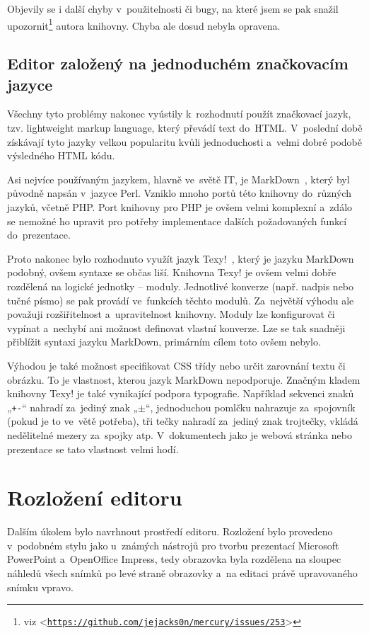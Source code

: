 \documentclass[11pt,twoside,a4paper]{book}
\let\oldUrl\url									%
\renewcommand\url[1]{<\texttt{\oldUrl{#1}}>}
\begin{document}
Objevily se i další chyby v~použitelnosti či bugy, na které jsem se pak snažil upozornit\footnote{viz \url{https://github.com/jejacks0n/mercury/issues/253}} autora knihovny. Chyba ale dosud nebyla opravena.

\subsection{Editor založený na jednoduchém značkovacím jazyce}
Všechny tyto problémy nakonec vyústily k~rozhodnutí použít značkovací jazyk, tzv. light\-weight markup language, který
převádí text do~HTML. V~poslední době získávají tyto jazyky velkou popularitu kvůli jednoduchosti a~velmi dobré podobě
výsledného HTML kódu.

Asi nejvíce používaným jazykem, hlavně ve~světě IT, je Mark\-Down~\cite{markdown}, který byl původně napsán v~jazyce Perl. Vzniklo mnoho portů této knihovny do~různých jazyků, včetně PHP. Port knihovny pro PHP je ovšem velmi komplexní a~zdálo se nemožné ho upravit pro potřeby imple\-mentace dalších požadovaných funkcí do~prezentace.

Proto nakonec bylo rozhodnuto využít jazyk Texy!~\cite{texy}, který je jazyku Mark\-Down podobný, ovšem syntaxe se občas liší. Knihovna Texy! je ovšem velmi dobře rozdělená na logické jednotky – moduly. Jednotlivé konverze (např. nadpis nebo tučné písmo) se pak provádí ve~funkcích těchto modulů. Za~největší výhodu ale považuji rozšiřitelnost a~upravitelnost knihovny. Moduly lze konfigurovat či vypínat a~nechybí ani možnost definovat vlastní konverze. Lze se tak snadněji přiblížit syntaxi jazyku Mark\-Down, primárním cílem toto ovšem nebylo.

Výhodou je také možnost specifikovat CSS třídy nebo určit zarovnání textu či obrázku. To je vlastnost, kterou jazyk Mark\-Down nepodporuje. Značným kladem knihovny Texy! je také vynikající podpora typografie. Například sekvenci znaků „\lstinline|+-|“ nahradí za~jediný znak „$\pm$“, jednoduchou pomlčku nahrazuje za~spojovník (pokud je to ve~větě potřeba), tři tečky nahradí za~jediný znak trojtečky, vkládá nedělitelné mezery za~spojky atp. V~dokumentech jako je webová stránka nebo prezentace se tato vlastnost velmi hodí.


\section{Rozložení editoru}
Dalším úkolem bylo navrhnout prostředí editoru. Rozložení bylo provedeno v~podobném stylu jako u~známých nástrojů pro tvorbu prezentací Microsoft PowerPoint a~OpenOffice Impress, tedy obrazovka byla rozdělena na sloupec náhledů všech snímků po levé straně obrazovky a~na editaci právě upravovaného snímku vpravo.
\end{document}
